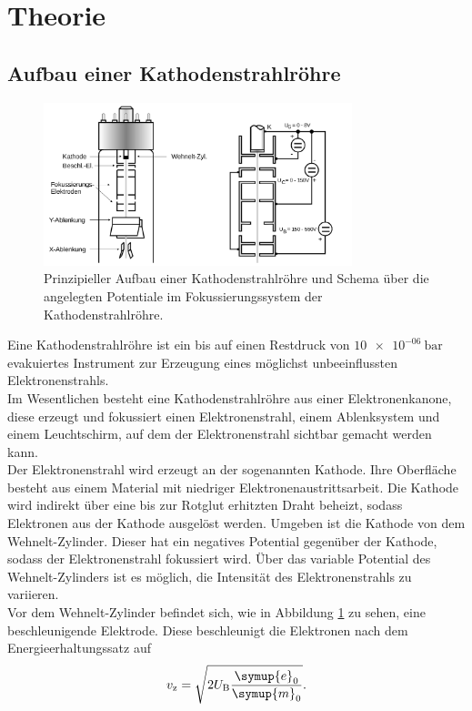 \section{Theorie}
\label{sec:Theorie}
\subsection{Aufbau einer Kathodenstrahlröhre}
\begin{figure}
  \centering
  \includegraphics[width=0.8\textwidth]{Messdaten/kathode.png}
  \caption{Prinzipieller Aufbau einer Kathodenstrahlröhre und Schema über die angelegten Potentiale im Fokussierungssystem der Kathodenstrahlröhre.}
  \label{fig:kathode}
\end{figure}
Eine Kathodenstrahlröhre ist ein bis auf einen Restdruck von $\SI{10e-06}{\bar}$ evakuiertes Instrument zur Erzeugung eines möglichst unbeeinflussten Elektronenstrahls.\\
Im Wesentlichen besteht eine Kathodenstrahlröhre aus einer Elektronenkanone, diese erzeugt und fokussiert einen Elektronenstrahl, einem Ablenksystem und einem Leuchtschirm, auf dem der Elektronenstrahl sichtbar gemacht werden kann.\\
Der Elektronenstrahl wird erzeugt an der sogenannten Kathode. Ihre Oberfläche besteht aus einem Material mit niedriger Elektronenaustrittsarbeit.
Die Kathode wird indirekt über eine bis zur Rotglut erhitzten Draht beheizt, sodass
Elektronen aus der Kathode ausgelöst werden.
Umgeben ist die Kathode von dem Wehnelt-Zylinder. Dieser hat ein negatives Potential gegenüber der Kathode, sodass der Elektronenstrahl fokussiert wird. Über das variable Potential des Wehnelt-Zylinders ist es möglich, die Intensität des Elektronenstrahls zu variieren.\\
Vor dem Wehnelt-Zylinder befindet sich, wie in Abbildung \ref{fig:kathode} zu sehen, eine beschleunigende Elektrode. Diese beschleunigt die Elektronen nach dem Energieerhaltungssatz auf
\begin{equation}
  \label{eqn:speedy}
  v_\mathrm{z}=\sqrt{2U_\mathrm{B}\frac{\symup{e}_0}{\symup{m}_0}} \text{.}
\end{equation}
